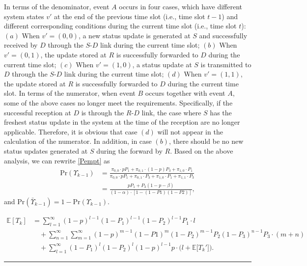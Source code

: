 \documentclass{IEEEtran}
\begin{document}
In terms of the denominator, event $A$ occurs in four cases, which have different system states $v'$ at the end of the previous time slot (i.e., time slot $t-1$) and different corresponding conditions during the current time slot (i.e., time slot $t$): $(a)$ When $v'=(0,0)$, a new status update is generated at $S$ and successfully received by $D$ through the $S$-$D$ link during the current time slot; $(b)$ When $v'=(0,1)$, the update stored at $R$ is successfully forwarded to $D$ during the current time slot; $(c)$ When $v'=(1,0)$, a status update at $S$ is transmitted to $D$ through the $S$-$D$ link during the current time slot; $(d)$ When $v'=(1,1)$, the update stored at $R$ is successfully forwarded to $D$ during the current time slot.  In terms of the numerator, when event $B$ occurs together with event $A$, some of the above cases no longer meet the requirements. Specifically, if the successful reception at $D$ is through the $R$-$D$ link, the case where $S$ has the freshest status update in the system at the time of the reception are no longer applicable. Therefore, it is obvious that case $(d)$ will not appear in the calculation of the numerator. In addition, in case $(b)$, there should be no new status updates generated at $S$ during the forward by $R$.
Based on the above analysis, we can rewrite \eqref{Pempt} as 
\begin{equation}\label{P_empty}
\begin{aligned}
\mathrm{Pr}(\Upsilon_{k-1})&=\frac{\pi_{0,0}\cdot pP_1+\pi_{0,1}\cdot (1-p)P_3+\pi_{1,0}\cdot P_1}{\pi_{0,0}\cdot pP_1+\pi_{0,1}\cdot P_3+\pi_{1,0}\cdot P_1+\pi_{1,1}\cdot P_3}\\
&=\frac{pP_1+P_3(1-p-\beta)}{(1-\alpha)\cdot[1-(1-P1)(1-P2)]},
\end{aligned}
\end{equation}
and $\mathrm{Pr}(\bar{\Upsilon}_{k-1})=1-\mathrm{Pr}(\Upsilon_{k-1})$.


 


\begin{figure*}
	\begin{equation}\label{T}
	\begin{aligned}
	\mathbb{E}[T_k]&=\sum_{l=1}^{\infty}(1-p)^{l-1}(1-P_1)^{l-1}(1-P_2)^{l-1}P_1\cdot l\\
	&\quad + \sum_{n=1}^{\infty}\sum_{m=1}^{\infty}(1-p)^{m-1}(1-P1)^m(1-P_2)^{m-1}P_2(1-P_3)^{n-1}P_3\cdot (m+n)\\
	&\quad +\sum_{l=1}^{\infty}(1-P_1)^l(1-P_2)^l(1-p)^{l-1}p\cdot \big(l+\mathbb{E}\big[T_k'\big]\big).
	\end{aligned}
	\end{equation}
	\vspace{-0.3cm}	
	\noindent\rule[0\baselineskip]{\textwidth}{0.4pt}
\end{figure*}
\end{document}
